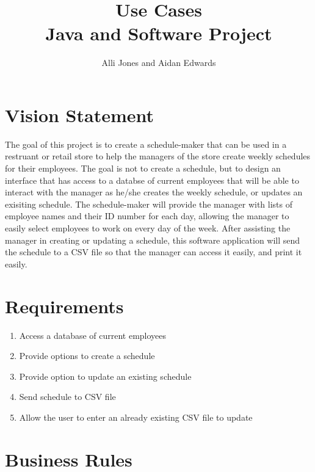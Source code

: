 \documentclass[12pt]{article}
\title{Use Cases\\Java and Software Project}
\author{Alli Jones and Aidan Edwards}
\begin{document}
\maketitle 
\thispagestyle{empty}

\section*{Vision Statement}

The goal of this project is to create a schedule-maker that can be used in a restruant  or retail store to help the managers of the store create weekly schedules for their employees.  The goal is not to create a schedule, but to design an interface that has access to a databse of current employees that will be able to interact with the manager as he/she creates the weekly schedule, or updates an exisiting schedule.  The schedule-maker will provide the manager with lists of employee names and their ID number for each day, allowing the manager to easily select employees to work on every day of the week.  After assisting the manager in creating or updating a schedule, this software application will send the schedule to a CSV file so that the manager can access it easily, and print it easily.

\section*{Requirements}

\begin{enumerate}

\item
Access a database of current employees

\item
Provide options to create a schedule

\item
Provide option to update an existing schedule

\item
Send schedule to CSV file

\item
Allow the user to enter an already existing CSV file to update


\end{enumerate}

\section*{Business Rules}
\end{document}
